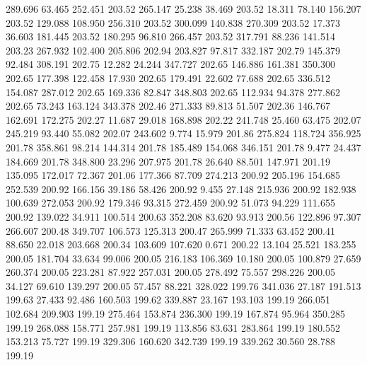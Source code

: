  289.696   63.465  252.451       203.52
 265.147   25.238   38.469       203.52
  18.311   78.140  156.207       203.52
 129.088  108.950  256.310       203.52
 300.099  140.838  270.309       203.52
  17.373   36.603  181.445       203.52
 180.295   96.810  266.457       203.52
 317.791   88.236  141.514       203.23
 267.932  102.400  205.806       202.94
 203.827   97.817  332.187       202.79
 145.379   92.484  308.191       202.75
  12.282   24.244  347.727       202.65
 146.886  161.381  350.300       202.65
 177.398  122.458   17.930       202.65
 179.491   22.602   77.688       202.65
 336.512  154.087  287.012       202.65
 169.336   82.847  348.803       202.65
 112.934   94.378  277.862       202.65
  73.243  163.124  343.378       202.46
 271.333   89.813   51.507       202.36
 146.767  162.691  172.275       202.27
  11.687   29.018  168.898       202.22
 241.748   25.460   63.475       202.07
 245.219   93.440   55.082       202.07
 243.602    9.774   15.979       201.86
 275.824  118.724  356.925       201.78
 358.861   98.214  144.314       201.78
 185.489  154.068  346.151       201.78
   9.477   24.437  184.669       201.78
 348.800   23.296  207.975       201.78
  26.640   88.501  147.971       201.19
 135.095  172.017   72.367       201.06
 177.366   87.709  274.213       200.92
 205.196  154.685  252.539       200.92
 166.156   39.186   58.426       200.92
   9.455   27.148  215.936       200.92
 182.938  100.639  272.053       200.92
 179.346   93.315  272.459       200.92
  51.073   94.229  111.655       200.92
 139.022   34.911  100.514       200.63
 352.208   83.620   93.913       200.56
 122.896   97.307  266.607       200.48
 349.707  106.573  125.313       200.47
 265.999   71.333   63.452       200.41
  88.650   22.018  203.668       200.34
 103.609  107.620    0.671       200.22
  13.104   25.521  183.255       200.05
 181.704   33.634   99.006       200.05
 216.183  106.369   10.180       200.05
 100.879   27.659  260.374       200.05
 223.281   87.922  257.031       200.05
 278.492   75.557  298.226       200.05
  34.127   69.610  139.297       200.05
  57.457   88.221  328.022       199.76
 341.036   27.187  191.513       199.63
  27.433   92.486  160.503       199.62
 339.887   23.167  193.103       199.19
 266.051  102.684  209.903       199.19
 275.464  153.874  236.300       199.19
 167.874   95.964  350.285       199.19
 268.088  158.771  257.981       199.19
 113.856   83.631  283.864       199.19
 180.552  153.213   75.727       199.19
 329.306  160.620  342.739       199.19
 339.262   30.560   28.788       199.19
